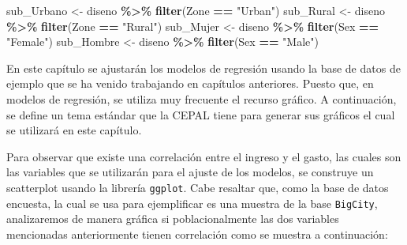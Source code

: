\documentclass[
  spanish,
  12pt,
]{book}
\newenvironment{Shaded}{\begin{snugshade}}{\end{snugshade}}
\newcommand{\FunctionTok}[1]{\textcolor[rgb]{0.13,0.29,0.53}{\textbf{#1}}}
\newcommand{\NormalTok}[1]{#1}
\newcommand{\OtherTok}[1]{\textcolor[rgb]{0.56,0.35,0.01}{#1}}
\newcommand{\SpecialCharTok}[1]{\textcolor[rgb]{0.81,0.36,0.00}{\textbf{#1}}}
\newcommand{\StringTok}[1]{\textcolor[rgb]{0.31,0.60,0.02}{#1}}
\begin{document}
\begin{Shaded}
\begin{Highlighting}[]
\NormalTok{sub\_Urbano }\OtherTok{\textless{}{-}}\NormalTok{ diseno }\SpecialCharTok{\%\textgreater{}\%}  \FunctionTok{filter}\NormalTok{(Zone }\SpecialCharTok{==} \StringTok{"Urban"}\NormalTok{)}
\NormalTok{sub\_Rural  }\OtherTok{\textless{}{-}}\NormalTok{ diseno }\SpecialCharTok{\%\textgreater{}\%}  \FunctionTok{filter}\NormalTok{(Zone }\SpecialCharTok{==} \StringTok{"Rural"}\NormalTok{)}
\NormalTok{sub\_Mujer  }\OtherTok{\textless{}{-}}\NormalTok{ diseno }\SpecialCharTok{\%\textgreater{}\%}  \FunctionTok{filter}\NormalTok{(Sex }\SpecialCharTok{==} \StringTok{"Female"}\NormalTok{)}
\NormalTok{sub\_Hombre }\OtherTok{\textless{}{-}}\NormalTok{ diseno }\SpecialCharTok{\%\textgreater{}\%}  \FunctionTok{filter}\NormalTok{(Sex }\SpecialCharTok{==} \StringTok{"Male"}\NormalTok{)}
\end{Highlighting}
\end{Shaded}

En este capítulo se ajustarán los modelos de regresión usando la base de datos de ejemplo que se ha venido trabajando en capítulos anteriores. Puesto que, en modelos de regresión, se utiliza muy frecuente el recurso gráfico. A continuación, se define un tema estándar que la CEPAL tiene para generar sus gráficos el cual se utilizará en este capítulo.

Para observar que existe una correlación entre el ingreso y el gasto, las cuales son las variables que se utilizarán para el ajuste de los modelos, se construye un scatterplot usando la librería \texttt{ggplot}. Cabe resaltar que, como la base de datos encuesta, la cual se usa para ejemplificar es una muestra de la base \texttt{BigCity}, analizaremos de manera gráfica si poblacionalmente las dos variables mencionadas anteriormente tienen correlación como se muestra a continuación:
\end{document}
